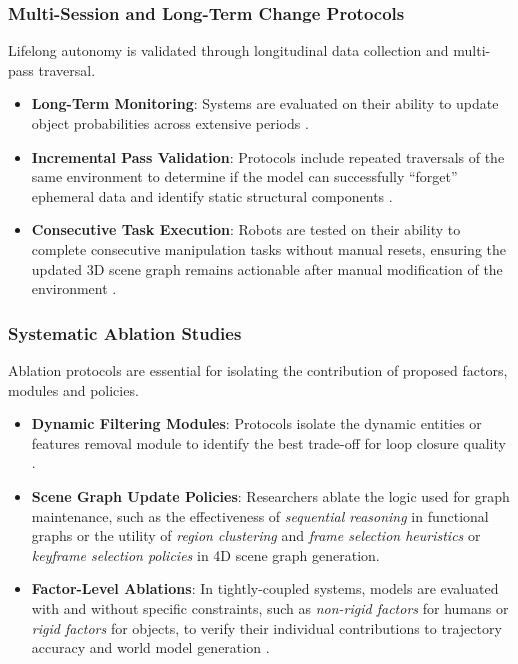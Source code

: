 \subsubsection{Multi-Session and Long-Term Change Protocols}
Lifelong autonomy is validated through longitudinal data collection and multi-pass traversal.

\begin{itemize}
    \item \textbf{Long-Term Monitoring}: Systems are evaluated on their ability to update object probabilities across extensive periods \cite{gomez_object-based_2020} \cite{patel_proactive_2022}.
    \item \textbf{Incremental Pass Validation}: Protocols include repeated traversals of the same environment to determine if the model can successfully ``forget'' ephemeral data and identify static  structural components \cite{walcott-bryant_dynamic_2012}.
    \item \textbf{Consecutive Task Execution}: Robots are tested on their ability to complete consecutive manipulation tasks without manual resets, ensuring the updated 3D scene graph remains actionable after manual modification of the environment \cite{yan_dynamic_2025}.
\end{itemize}

\subsubsection{Systematic Ablation Studies}
Ablation protocols are essential for isolating the contribution of proposed factors, modules and policies.

\begin{itemize}
    \item \textbf{Dynamic Filtering Modules}: Protocols isolate the dynamic entities or features removal module to identify the best trade-off for loop closure quality \cite{giberna_dynemo-slam_2025}.
    \item \textbf{Scene Graph Update Policies}: Researchers ablate the logic used for graph maintenance, such as the effectiveness of \textit{sequential reasoning} in functional graphs \cite{zhang_open-vocabulary_2025} or the utility of \textit{region clustering} and \textit{frame selection heuristics} \cite{gorlo_describe_2025} or \textit{keyframe selection policies} \cite{giberna_dynemo-slam_2025} in 4D scene graph generation.
    \item \textbf{Factor-Level Ablations}: In tightly-coupled systems, models are evaluated with and without specific constraints, such as \textit{non-rigid factors} for humans or \textit{rigid factors} for objects, to verify their individual contributions to trajectory accuracy and world model generation \cite{giberna_dynemo-slam_2025} \cite{ding_dynamic_2025}.
\end{itemize}


